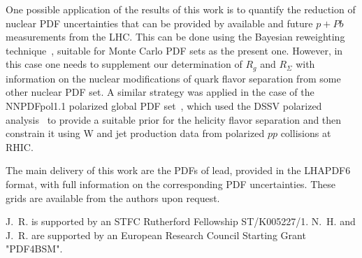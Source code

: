 One possible application of the results of this work is to quantify the reduction of
nuclear PDF uncertainties that can be provided by available and future $p+Pb$ measurements
from the LHC.
%
This can be done using the Bayesian reweighting technique~\cite{Ball:2011gg,Ball:2010gb},
suitable for Monte Carlo PDF sets as the present one.
%
However, in this case one needs to supplement our determination of $R_g$ and $R_{\Sigma}$ with information
on the nuclear modifications of quark flavor separation from some other nuclear PDF set.
%
A similar strategy was applied in the case of the NNPDFpol1.1 polarized global PDF set~\cite{Nocera:2014gqa}, which used the DSSV
polarized analysis~\cite{deFlorian:2009vb} to provide a suitable prior for the helicity flavor separation and then constrain it
using W and jet production data from polarized $pp$ collisions at RHIC.

The main delivery of this work are the PDFs of lead, provided in the {\sc\small LHAPDF6} format, with
full information on the corresponding PDF uncertainties.
%
These grids are available from the authors upon request.

\vspace{2cm}

%
J.~R. is supported by an STFC Rutherford Fellowship ST/K005227/1.
%
N.~H. and J.~R. are
supported by an European Research Council Starting Grant "PDF4BSM".
%
